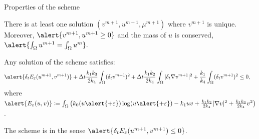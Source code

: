 \begin{frame}{Properties of the 
  scheme}
  \footnotesize
  \vspace*{-0.2cm}
  \begin{theorem}
      \label{cha3:cor:esquema_DG_upw_KS_no_parte_pos}
      \alert{There is at least one solution} $(v^{m+1}, u^{m+1}, \mu^{m+1})$ where $v^{m+1}$ is unique. Moreover, $\alert{v^{m+1}, u^{m+1}\ge 0}$ and the mass of $u$ is conserved, $\alert{\int_\Omega u^{m+1}=\int_\Omega u^m}.$
  \end{theorem}
  \pause


  \vspace*{0.5cm}
  \begin{theorem}
      \label{cha3:thm:energia_esquema_KS}
      Any solution of the scheme satisfies:
      {\fontsize{7}{8}
      \begin{align*}
      \alert{\delta_t E_\varepsilon(u^{m+1}, v^{m+1})}
      &+ \Delta t \frac{k_1 k_3}{2k_4}\int_\Omega (\delta_t v^{m+1})^2+ \Delta t \frac{k_1k_2}{2k_4}\int_\Omega\vert\delta_t \nabla v^{m+1}\vert^2
      + 
      \frac{k_1}{k_4} \int_\Omega (\delta_t v^{m+1})^2
      \le
      0,
      \end{align*}
      }
      where 
      $\alert{E_\varepsilon(u,v)}\coloneqq\int_\Omega \big(k_0(u\alert{+\varepsilon})\log(u\alert{+\varepsilon})-k_1uv+\frac{k_1k_2}{2k_4}\vert\nabla v\vert ^2+\frac{k_1k_3}{2k_4}v^2\big)$.
      
      \vspace*{0.1cm}
      The scheme is  in the sense $\alert{\delta_t E_\varepsilon(u^{m+1}, v^{m+1})\le 0}$.
  \end{theorem}

\end{frame}

